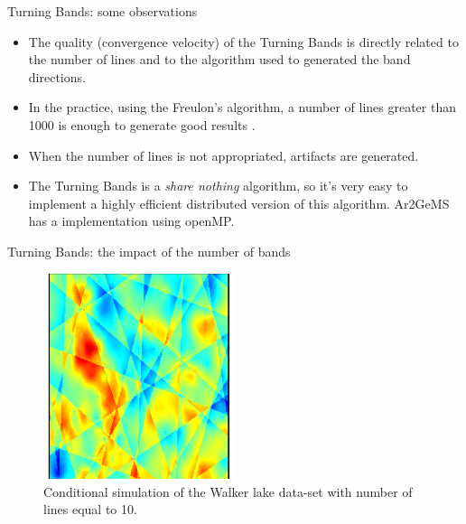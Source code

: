 \begin{frame}{Turning Bands: some observations}
 \begin{itemize}
  \item The quality (convergence velocity) of the Turning Bands is directly related to the number of lines and to the algorithm
  used to generated the band directions.
  \item In the practice, using the Freulon's algorithm, a number of lines greater than 1000 is enough to generate good results \cite{emery2006tbsim}.
  \item When the number of lines is not appropriated, artifacts are generated.
  \item The Turning Bands is a \textit{share nothing} algorithm, so it's very easy to implement a highly efficient distributed version
  of this algorithm. Ar2GeMS has a implementation using openMP.
 \end{itemize}
\end{frame}


\begin{frame}{Turning Bands: the impact of the number of bands}
 
\begin{figure}
\begin{center}
\includegraphics[width=0.5\textwidth]{figs/walker_lake_tb_n_10.pdf}
\end{center}
\caption{Conditional simulation of the Walker lake data-set with number of lines equal to 10.}
\label{fig:gaussian_unc_simulation}
\end{figure}
\end{frame}


